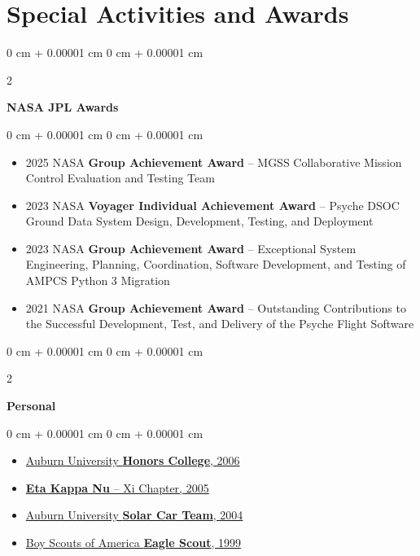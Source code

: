 \documentclass[10pt, letterpaper]{article}
\newenvironment{highlights}{
    \begin{itemize}[
        topsep=0.10 cm,
        parsep=0.10 cm,
        partopsep=0pt,
        itemsep=0pt,
        leftmargin=0 cm + 10pt
    ]
}{
    \end{itemize}
} %
\newenvironment{onecolentry}{
    \begin{adjustwidth}{
        0 cm + 0.00001 cm
    }{
        0 cm + 0.00001 cm
    }
}{
    \end{adjustwidth}
} %
\newenvironment{twocolentry}[2][]{
    \onecolentry
    \def\secondColumn{#2}
    \setcolumnwidth{\fill, 4.5 cm}
    \begin{paracol}{2}
}{
    \switchcolumn \raggedleft \secondColumn
    \end{paracol}
    \endonecolentry
} %
\begin{document}
    \section{Special Activities and Awards}

        
        \begin{twocolentry}{
        }
            \textbf{NASA JPL Awards}\end{twocolentry}

        \vspace{0.10 cm}
        \begin{onecolentry}
            \begin{highlights}
                \item 2025 NASA \textbf{Group Achievement Award} -- MGSS Collaborative Mission Control Evaluation and Testing Team
                \item 2023 NASA \textbf{Voyager Individual Achievement Award} -- Psyche DSOC Ground Data System Design, Development, Testing, and Deployment 
                \item 2023 NASA \textbf{Group Achievement Award} -- Exceptional System Engineering, Planning, Coordination, Software Development, and Testing of AMPCS Python 3 Migration
                \item 2021 NASA \textbf{Group Achievement Award} -- Outstanding Contributions to the Successful Development, Test, and Delivery of the Psyche Flight Software
            \end{highlights}
        \end{onecolentry}


        \vspace{0.2 cm}

        \begin{twocolentry}{
            
        }
            \textbf{Personal}\end{twocolentry}

        \vspace{0.10 cm}
        \begin{onecolentry}
            \begin{highlights}
                \item \href{http://www.auburn.edu/honors/college/}{Auburn University \textbf{Honors College}, 2006}
                \item \href{http://www.eng.auburn.edu/organizations/HKN/}{\textbf{Eta Kappa Nu} -- Xi Chapter, 2005}
                \item \href{http://www.eng.auburn.edu/organizations/SOA/}{Auburn University \textbf{Solar Car Team}, 2004}
                \item \href{https://www.scouting.org/about/research/eagle-scouts/}{Boy Scouts of America \textbf{Eagle Scout}, 1999}
            \end{highlights}
        \end{onecolentry}
\end{document}
